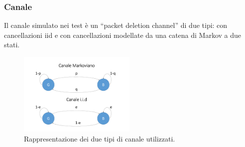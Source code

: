 \documentclass[italian, a4paper, 12pt]{article}
\begin{document}

\subsubsection{Canale}
\label{sec:markov}
Il canale simulato nei test è un ``packet deletion channel'' di due
tipi: con cancellazioni iid e con cancellazioni modellate da una
catena di Markov a due stati.
%
\begin{figure}[htb]
    \centering
        \includegraphics[clip, trim=0cm 1cm 0cm 1cm, width=0.5\textwidth]{Channel.pdf}
    \caption{Rappresentazione dei due tipi di canale utilizzati.}
    \label{fig:Channel}
\end{figure}
\end{document}
